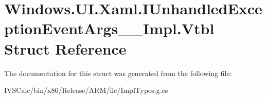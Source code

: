\hypertarget{struct_windows_1_1_u_i_1_1_xaml_1_1_i_unhandled_exception_event_args_____impl_1_1_vtbl}{}\section{Windows.\+U\+I.\+Xaml.\+I\+Unhandled\+Exception\+Event\+Args\+\_\+\+\_\+\+Impl.\+Vtbl Struct Reference}
\label{struct_windows_1_1_u_i_1_1_xaml_1_1_i_unhandled_exception_event_args_____impl_1_1_vtbl}


The documentation for this struct was generated from the following file\+:\begin{DoxyCompactItemize}
\item 
I\+V\+S\+Calc/bin/x86/\+Release/\+A\+R\+M/ilc/Impl\+Types.\+g.\+cs\end{DoxyCompactItemize}
